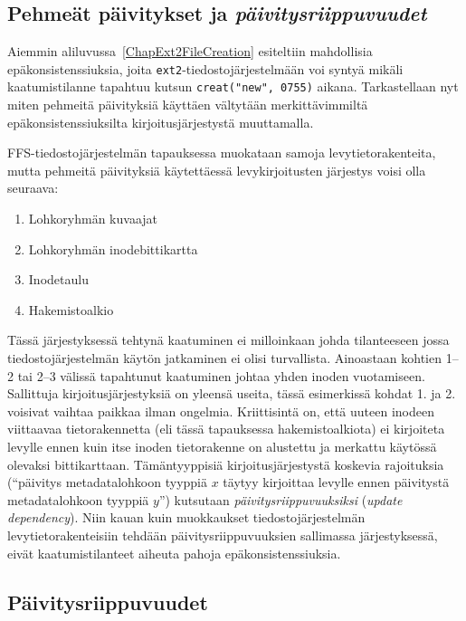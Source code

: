\subsection{Pehmeät päivitykset ja \emph{päivitysriippuvuudet}}
Aiemmin aliluvussa~\ref{ChapExt2FileCreation} esiteltiin mahdollisia epäkonsistenssiuksia,
joita \texttt{ext2}-tiedostojärjestelmään voi syntyä mikäli kaatumistilanne tapahtuu kutsun \texttt{creat("new", 0755)} aikana.
Tarkastellaan nyt miten pehmeitä päivityksiä käyttäen vältytään merkittävimmiltä epäkonsistenssiuksilta kirjoitusjärjestystä muuttamalla.

FFS-tiedostojärjestelmän tapauksessa muokataan samoja levytietorakenteita,
mutta pehmeitä päivityksiä käytettäessä levykirjoitusten järjestys voisi olla seuraava:
\begin{enumerate}
    \item{Lohkoryhmän kuvaajat}
    \item{Lohkoryhmän inodebittikartta}
    \item{Inodetaulu}
    \item{Hakemistoalkio}
\end{enumerate}
%
Tässä järjestyksessä tehtynä kaatuminen ei milloinkaan johda tilanteeseen jossa tiedostojärjestelmän käytön jatkaminen ei olisi turvallista.
Ainoastaan kohtien 1--2 tai 2--3 välissä tapahtunut kaatuminen johtaa yhden inoden vuotamiseen.
Sallittuja kirjoitusjärjestyksiä on yleensä useita, tässä esimerkissä kohdat 1. ja 2. voisivat vaihtaa paikkaa ilman ongelmia.
Kriittisintä on, että uuteen inodeen viittaavaa tietorakennetta (eli tässä tapauksessa hakemistoalkiota) ei kirjoiteta levylle ennen kuin itse inoden tietorakenne on alustettu ja merkattu käytössä olevaksi bittikarttaan.
Tämäntyyppisiä kirjoitusjärjestystä koskevia rajoituksia (``päivitys metadatalohkoon tyyppiä $x$ täytyy kirjoittaa levylle ennen päivitystä metadatalohkoon tyyppiä $y$'') kutsutaan \emph{päivitysriippuvuuksiksi} (\emph{update dependency}).
Niin kauan kuin muokkaukset tiedostojärjestelmän levytietorakenteisiin tehdään päivitysriippuvuuksien sallimassa järjestyksessä,
eivät kaatumistilanteet aiheuta pahoja epäkonsistenssiuksia.

\subsection{Päivitysriippuvuudet}

